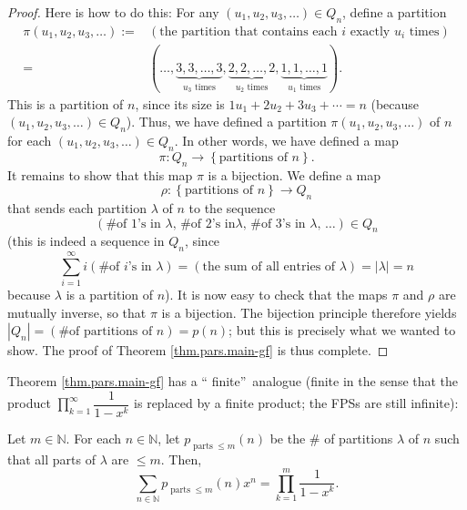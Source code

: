 \begin{proof}
Here is how to do this: For any $\left(  u_{1},u_{2},u_{3},\ldots\right)  \in
Q_{n}$, define a partition%
\begin{align*}
\pi\left(  u_{1},u_{2},u_{3},\ldots\right)  :=  &  \left(  \text{the partition
that contains each }i\text{ exactly }u_{i}\text{ times}\right) \\
=  &  \left(  \ldots,\underbrace{3,3,\ldots,3}_{u_{3}\text{ times}%
},\underbrace{2,2,\ldots,2}_{u_{2}\text{ times}},\underbrace{1,1,\ldots
,1}_{u_{1}\text{ times}}\right)  .
\end{align*}
This is a partition of $n$, since its size is $1u_{1}+2u_{2}+3u_{3}+\cdots=n$
(because $\left(  u_{1},u_{2},u_{3},\ldots\right)  \in Q_{n}$). Thus, we have
defined a partition $\pi\left(  u_{1},u_{2},u_{3},\ldots\right)  $ of $n$ for
each $\left(  u_{1},u_{2},u_{3},\ldots\right)  \in Q_{n}$. In other words, we
have defined a map
\[
\pi:Q_{n}\rightarrow\left\{  \text{partitions of }n\right\}  .
\]
It remains to show that this map $\pi$ is a bijection. We define a map%
\[
\rho:\left\{  \text{partitions of }n\right\}  \rightarrow Q_{n}%
\]
that sends each partition $\lambda$ of $n$ to the sequence%
\[
\left(  \text{\# of }1\text{'s in }\lambda\text{,\ \ \# of }2\text{'s in
}\lambda\text{,\ \ \# of }3\text{'s in }\lambda\text{, \ }\ldots\right)  \in
Q_{n}%
\]
(this is indeed a sequence in $Q_{n}$, since
\[
\sum_{i=1}^{\infty}i\left(  \text{\# of }i\text{'s in }\lambda\right)
=\left(  \text{the sum of all entries of }\lambda\right)  =\left\vert
\lambda\right\vert =n
\]
because $\lambda$ is a partition of $n$). It is now easy to check that the
maps $\pi$ and $\rho$ are mutually inverse, so that $\pi$ is a bijection. The
bijection principle therefore yields $\left\vert Q_{n}\right\vert =\left(
\text{\# of partitions of }n\right)  =p\left(  n\right)  $; but this is
precisely what we wanted to show. The proof of Theorem \ref{thm.pars.main-gf}
is thus complete.
\end{proof}

Theorem \ref{thm.pars.main-gf} has a \textquotedblleft
finite\textquotedblright\ analogue (finite in the sense that the product
$\prod_{k=1}^{\infty}\dfrac{1}{1-x^{k}}$ is replaced by a finite product; the
FPSs are still infinite):

\begin{theorem}
\label{thm.pars.main-gf-parts-n}Let $m\in\mathbb{N}$. For each $n\in
\mathbb{N}$, let $p_{\operatorname*{parts}\leq m}\left(  n\right)  $ be the \#
of partitions $\lambda$ of $n$ such that all parts of $\lambda$ are $\leq m$.
Then,
\[
\sum_{n\in\mathbb{N}}p_{\operatorname*{parts}\leq m}\left(  n\right)
x^{n}=\prod_{k=1}^{m}\dfrac{1}{1-x^{k}}.
\]

\end{theorem}

